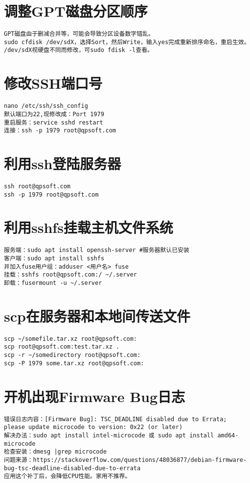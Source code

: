 \documentclass[a4paper,fontset=fandol,zihao=-4,linespread=1.2]{ctexbook}
\begin{document}
\section{调整GPT磁盘分区顺序}
\begin{lstlisting}
GPT磁盘由于删减合并等，可能会导致分区设备数字错乱。
sudo cfdisk /dev/sdX，选择Sort，然后Write，输入yes完成重新排序命名，重启生效。
/dev/sdX视硬盘不同而修改，可sudo fdisk -l查看。
\end{lstlisting}

\section{修改SSH端口号}
\begin{lstlisting}
nano /etc/ssh/ssh_config
默认端口为22,现修改成：Port 1979
重启服务：service sshd restart
连接：ssh -p 1979 root@qpsoft.com
\end{lstlisting}

\section{利用ssh登陆服务器}
\begin{lstlisting}
ssh root@qpsoft.com
ssh -p 1979 root@qpsoft.com
\end{lstlisting}

\section{利用sshfs挂载主机文件系统}
\begin{lstlisting}
服务端：sudo apt install openssh-server #服务器默认已安装
客户端：sudo apt install sshfs
并加入fuse用户组：adduser <用户名> fuse
挂载：sshfs root@qpsoft.com:/ ~/.server
卸载：fusermount -u ~/.server
\end{lstlisting}

\section{scp在服务器和本地间传送文件}
\begin{lstlisting}
scp ~/somefile.tar.xz root@qpsoft.com:
scp root@qpsoft.com:test.tar.xz .
scp -r ~/somedirectory root@qpsoft.com:
scp -P 1979 some.tar.xz root@qpsoft.com:
\end{lstlisting}

\section{开机出现Firmware Bug日志}
\begin{lstlisting}
错误日志内容：[Firmware Bug]: TSC_DEADLINE disabled due to Errata; please update microcode to version: 0x22 (or later)
解决办法：sudo apt install intel-microcode 或 sudo apt install amd64-microcode
检查安装：dmesg |grep microcode
问题来源：https://stackoverflow.com/questions/48036877/debian-firmware-bug-tsc-deadline-disabled-due-to-errata
应用这个补丁后，会降低CPU性能。家用不推荐。
\end{lstlisting}
\end{document}
